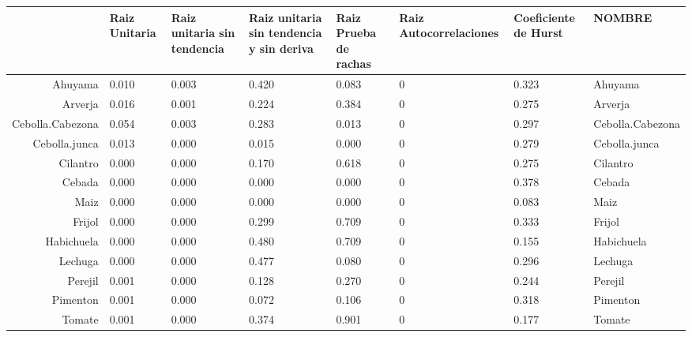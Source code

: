 \documentclass[11pt]{article}
\begin{document}
    \begin{tabular}{r|lllllll}
  & Raiz Unitaria & Raiz unitaria sin tendencia & Raiz unitaria sin tendencia y sin deriva & Raiz Prueba de rachas & Raiz Autocorrelaciones & Coeficiente de Hurst & NOMBRE\\
\hline
	Ahuyama & 0.010            & 0.003            & 0.420            & 0.083            & 0                & 0.323            & Ahuyama         \\
	Arverja & 0.016            & 0.001            & 0.224            & 0.384            & 0                & 0.275            & Arverja         \\
	Cebolla.Cabezona & 0.054            & 0.003            & 0.283            & 0.013            & 0                & 0.297            & Cebolla.Cabezona\\
	Cebolla.junca & 0.013            & 0.000            & 0.015            & 0.000            & 0                & 0.279            & Cebolla.junca   \\
	Cilantro & 0.000            & 0.000            & 0.170            & 0.618            & 0                & 0.275            & Cilantro        \\
	Cebada & 0.000            & 0.000            & 0.000            & 0.000            & 0                & 0.378            & Cebada          \\
	Maiz & 0.000            & 0.000            & 0.000            & 0.000            & 0                & 0.083            & Maiz            \\
	Frijol & 0.000            & 0.000            & 0.299            & 0.709            & 0                & 0.333            & Frijol          \\
	Habichuela & 0.000            & 0.000            & 0.480            & 0.709            & 0                & 0.155            & Habichuela      \\
	Lechuga & 0.000            & 0.000            & 0.477            & 0.080            & 0                & 0.296            & Lechuga         \\
	Perejil & 0.001            & 0.000            & 0.128            & 0.270            & 0                & 0.244            & Perejil         \\
	Pimenton & 0.001            & 0.000            & 0.072            & 0.106            & 0                & 0.318            & Pimenton        \\
	Tomate & 0.001            & 0.000            & 0.374            & 0.901            & 0                & 0.177            & Tomate          \\

\end{tabular}
\end{document}
